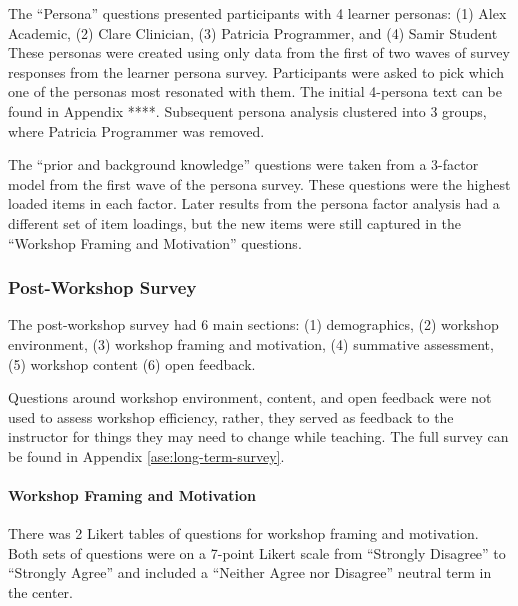 \documentclass[030-workshop.tex]{subfiles}
\begin{document}
      The ``Persona'' questions presented participants with 4 learner personas:
      (1) Alex Academic,
      (2) Clare Clinician,
      (3) Patricia Programmer, and
      (4) Samir Student
      These personas were created using only data from the first of two waves of survey responses from the learner persona survey.
      Participants were asked to pick which one of the personas most resonated with them.
      The initial 4-persona text can be found in Appendix ****. %
      Subsequent persona analysis clustered into 3 groups, where Patricia Programmer was removed.

      The ``prior and background knowledge'' questions were taken from
      a 3-factor model from the first wave of the persona survey. %
      These questions were the highest loaded items in each factor.
      Later results from the persona factor analysis had a different set of item loadings,
      but the new items were still captured in the ``Workshop Framing and Motivation'' questions.

  \subsubsection{Post-Workshop Survey}

      The post-workshop survey had 6 main sections:
      (1) demographics,
      (2) workshop environment,
      (3) workshop framing and motivation,
      (4) summative assessment,
      (5) workshop content
      (6) open feedback.

      Questions around workshop environment, content, and open feedback
      were not used to assess workshop efficiency,
      rather, they served as feedback to the instructor for things they may need to change while teaching.
      The full survey can be found in Appendix \ref{ase:long-term-survey}.

      \paragraph{Workshop Framing and Motivation}

          There was 2 Likert tables of questions for workshop framing and motivation.
          Both sets of questions were on a 7-point Likert scale from
          ``Strongly Disagree'' to ``Strongly Agree'' and
          included a ``Neither Agree nor Disagree'' neutral term in the center.
\end{document}
